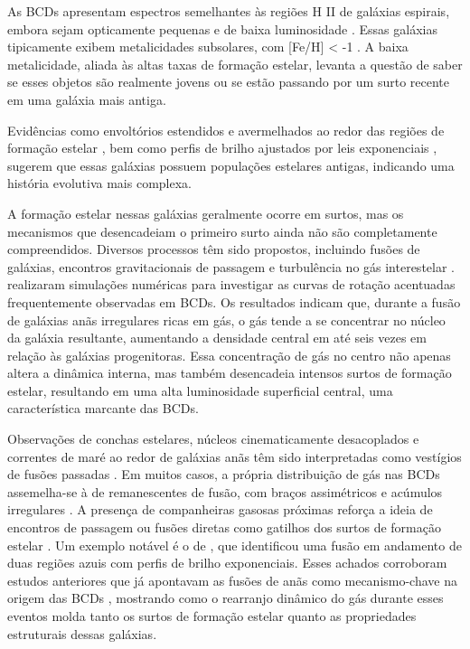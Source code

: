 As BCDs apresentam espectros semelhantes às regiões H II de galáxias espirais, embora sejam opticamente pequenas e de baixa luminosidade \citep{Thuan_Martin_1981}. Essas galáxias tipicamente exibem metalicidades subsolares, com [Fe/H] < -1 \citep{Drozdovsky_Tikhonov_2000, Drozdovsky_2001}. A baixa metalicidade, aliada às altas taxas de formação estelar, levanta a questão de saber se esses objetos são realmente jovens ou se estão passando por um surto recente em uma galáxia mais antiga.

Evidências como envoltórios estendidos e avermelhados ao redor das regiões de formação estelar \citep{Loose_1985, Kunth_1985}, bem como perfis de brilho ajustados por leis exponenciais \citep{James_1994, Telles_1995, Papaderos_1996, Cairos_1998}, sugerem que essas galáxias possuem populações estelares antigas, indicando uma história evolutiva mais complexa.

A formação estelar nessas galáxias geralmente ocorre em surtos, mas os mecanismos que desencadeiam o primeiro surto ainda não são completamente compreendidos. Diversos processos têm sido propostos, incluindo fusões de galáxias, encontros gravitacionais de passagem e turbulência no gás interestelar \citep{Noeske_2001, Pustilnik_2001, Bekki_2008}. \cite{Watts_2016} realizaram simulações numéricas para investigar as curvas de rotação acentuadas frequentemente observadas em BCDs. Os resultados indicam que, durante a fusão de galáxias anãs irregulares ricas em gás, o gás tende a se concentrar no núcleo da galáxia resultante, aumentando a densidade central em até seis vezes em relação às galáxias progenitoras. Essa concentração de gás no centro não apenas altera a dinâmica interna, mas também desencadeia intensos surtos de formação estelar, resultando em uma alta luminosidade superficial central, uma característica marcante das BCDs.


Observações de conchas estelares, núcleos cinematicamente desacoplados e correntes de maré ao redor de galáxias anãs têm sido interpretadas como vestígios de fusões passadas \citep{Geha_2005, Rich_2012, Penny_2012, Toloba_2014, Daya_2022}. Em muitos casos, a própria distribuição de gás nas BCDs assemelha-se à de remanescentes de fusão, com braços assimétricos e acúmulos irregulares \citep{Ekta_2008}. A presença de companheiras gasosas próximas reforça a ideia de encontros de passagem ou fusões diretas como gatilhos dos surtos de formação estelar \citep{Pustilnik_2001}. Um exemplo notável é o de \cite{Pak_2016}, que identificou uma fusão em andamento de duas regiões azuis com perfis de brilho exponenciais. Esses achados corroboram estudos anteriores que já apontavam as fusões de anãs como mecanismo-chave na origem das BCDs \citep{Noeske_2001, Ostlin_2001, Bekki_2008}, mostrando como o rearranjo dinâmico do gás durante esses eventos molda tanto os surtos de formação estelar quanto as propriedades estruturais dessas galáxias.

